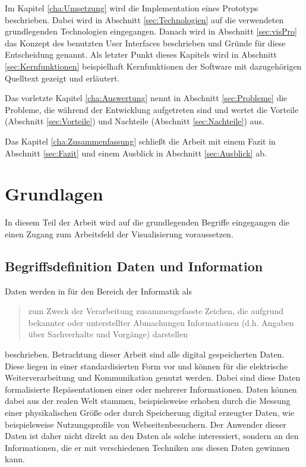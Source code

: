 \documentclass[a4paper, 12pt, DIVcalc, onepage, pdftex, headsepline, footsepline]{scrreprt}
\begin{document}
Im Kapitel \ref{cha:Umsetzung} wird die Implementation eines Prototyps beschrieben. Dabei wird in Abschnitt
\ref{sec:Technologien} auf die verwendeten grundlegenden Technologien eingegangen. Danach wird in Abschnitt
\ref{sec:visPro} das Konzept des benutzten User Interfaces beschrieben und Gründe für diese Entscheidung genannt.
Als letzter Punkt dieses Kapitels wird in Abschnitt \ref{sec:Kernfunktionen} beispielhaft Kernfunktionen
der Software mit dazugehörigen Quelltext gezeigt und erläutert.

Das vorletzte Kapitel \ref{cha:Auswertung} nennt in Abschnitt \ref{sec:Probleme} die Probleme, die während
der Entwicklung aufgetreten sind und wertet die Vorteile (Abschnitt \ref{sec:Vorteile}) und Nachteile
(Abschnitt \ref{sec:Nachteile}) aus.

Das Kapitel \ref{cha:Zusammenfassung} schließt die Arbeit mit einem Fazit in Abschnitt \ref{sec:Fazit} und
einem Ausblick in Abschnitt \ref{sec:Ausblick} ab.

\chapter{Grundlagen}
\label{cha:Grundlagen}
In diesem Teil der Arbeit wird auf die grundlegenden Begriffe eingegangen die einen Zugang
zum Arbeitsfeld der Visualisierung voraussetzen.
\section{Begriffsdefinition Daten und Information}
\label{sec:DatenInfo}
Daten werden in \cite{Gabler} für den Bereich der Informatik als
\begin{quote}
zum Zweck der Verarbeitung zusammengefasste Zeichen, die aufgrund bekannter oder unterstellter Abmachungen
Informationen (d.h. Angaben über Sachverhalte und Vorgänge) darstellen
\end{quote}
beschrieben.
Betrachtung dieser Arbeit sind alle digital gespeicherten Daten.
Diese liegen in einer standardisierten Form vor und können für die elektrische Weiterverarbeitung
und Kommunikation genutzt werden. Dabei sind diese Daten formalisierte Repäsentationen einer
oder mehrerer Informationen. Daten können dabei aus der realen Welt stammen, beispielsweise erhoben durch
die Messung einer physikalischen Größe oder durch Speicherung digital erzeugter Daten, wie
beispielsweise Nutzungsprofile von Webseitenbesuchern.
Der Anwender dieser Daten ist daher nicht direkt an den Daten als solche interessiert, sondern
an den Informationen, die er mit verschiedenen Techniken aus diesen Daten gewinnen kann.
\end{document}
